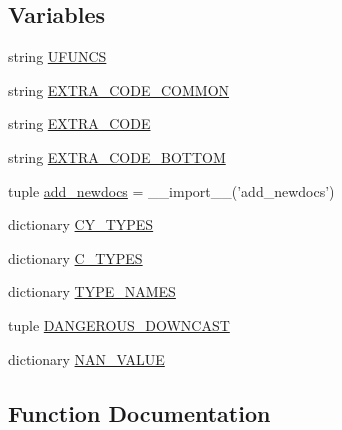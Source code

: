 \subsection*{Variables}
\begin{DoxyCompactItemize}
\item 
string \hyperlink{namespacescipy_1_1special_1_1generate__ufuncs_a7d934652eb2f7492698636737a4c826c}{U\+F\+U\+N\+C\+S}
\item 
string \hyperlink{namespacescipy_1_1special_1_1generate__ufuncs_a8a92e12ccc551a7163ad68e57106b179}{E\+X\+T\+R\+A\+\_\+\+C\+O\+D\+E\+\_\+\+C\+O\+M\+M\+O\+N}
\item 
string \hyperlink{namespacescipy_1_1special_1_1generate__ufuncs_a943ae4cdb059f402d7b0b0d64e0126b2}{E\+X\+T\+R\+A\+\_\+\+C\+O\+D\+E}
\item 
string \hyperlink{namespacescipy_1_1special_1_1generate__ufuncs_ae166fec34c660258ed3c76495a2637b7}{E\+X\+T\+R\+A\+\_\+\+C\+O\+D\+E\+\_\+\+B\+O\+T\+T\+O\+M}
\item 
tuple \hyperlink{namespacescipy_1_1special_1_1generate__ufuncs_ad1b9e2bec6b0ef6b534654f30a76a953}{add\+\_\+newdocs} = \+\_\+\+\_\+import\+\_\+\+\_\+('add\+\_\+newdocs')
\item 
dictionary \hyperlink{namespacescipy_1_1special_1_1generate__ufuncs_a01863edc87085deb106b5ccc3e5ef3ef}{C\+Y\+\_\+\+T\+Y\+P\+E\+S}
\item 
dictionary \hyperlink{namespacescipy_1_1special_1_1generate__ufuncs_a42df7cb237810d12d13f5dbb9f907dd9}{C\+\_\+\+T\+Y\+P\+E\+S}
\item 
dictionary \hyperlink{namespacescipy_1_1special_1_1generate__ufuncs_a800d81e3775d7c22733667b87973e576}{T\+Y\+P\+E\+\_\+\+N\+A\+M\+E\+S}
\item 
tuple \hyperlink{namespacescipy_1_1special_1_1generate__ufuncs_ae07e024ca78866d3cc371ee3cf76f549}{D\+A\+N\+G\+E\+R\+O\+U\+S\+\_\+\+D\+O\+W\+N\+C\+A\+S\+T}
\item 
dictionary \hyperlink{namespacescipy_1_1special_1_1generate__ufuncs_ae8498267d11764ae7751c668923040bf}{N\+A\+N\+\_\+\+V\+A\+L\+U\+E}
\end{DoxyCompactItemize}


\subsection{Function Documentation}
\hypertarget{namespacescipy_1_1special_1_1generate__ufuncs_aae3daffa4c00d017b8ce91f65b8ff491}{}
